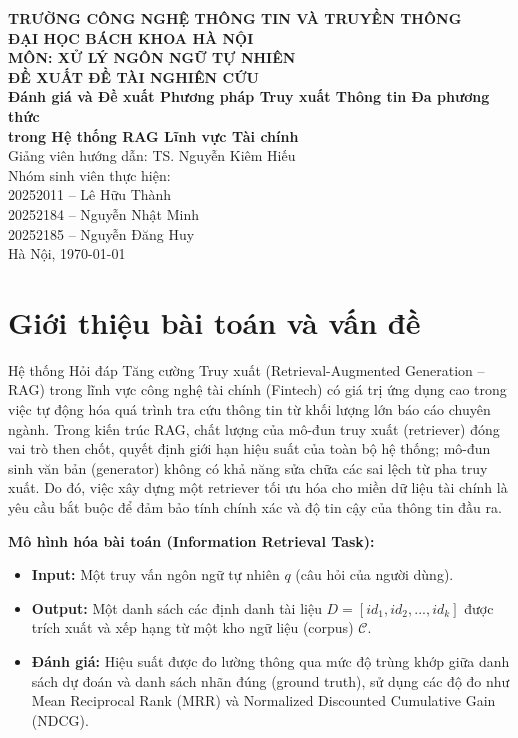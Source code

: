 \documentclass[12pt,a4paper]{article}
\begin{document}
\begin{center}
{\large \textbf{TRƯỜNG CÔNG NGHỆ THÔNG TIN VÀ TRUYỀN THÔNG}}\\
{\large \textbf{ĐẠI HỌC BÁCH KHOA HÀ NỘI}}\\[0.5cm]
{\large \textbf{MÔN: XỬ LÝ NGÔN NGỮ TỰ NHIÊN}}\\[0.5cm]
{\large \textbf{ĐỀ XUẤT ĐỀ TÀI NGHIÊN CỨU}}\\[0.5cm]
{\Large \textbf{Đánh giá và Đề xuất Phương pháp Truy xuất Thông tin Đa phương thức}}\\
{\Large \textbf{trong Hệ thống RAG Lĩnh vực Tài chính}}\\[0.5cm]
{\large Giảng viên hướng dẫn: TS. Nguyễn Kiêm Hiếu}\\[0.2cm]
{\large Nhóm sinh viên thực hiện:}\\
{\large 20252011 – Lê Hữu Thành}\\
{\large 20252184 – Nguyễn Nhật Minh}\\
{\large 20252185 – Nguyễn Đăng Huy}\\[0.5cm]
{\large Hà Nội, \today}
\end{center}

\section{Giới thiệu bài toán và vấn đề}

Hệ thống Hỏi đáp Tăng cường Truy xuất (Retrieval-Augmented Generation – RAG) trong lĩnh vực công nghệ tài chính (Fintech) có giá trị ứng dụng cao trong việc tự động hóa quá trình tra cứu thông tin từ khối lượng lớn báo cáo chuyên ngành. Trong kiến trúc RAG, chất lượng của mô-đun truy xuất (retriever) đóng vai trò then chốt, quyết định giới hạn hiệu suất của toàn bộ hệ thống; mô-đun sinh văn bản (generator) không có khả năng sửa chữa các sai lệch từ pha truy xuất. Do đó, việc xây dựng một retriever tối ưu hóa cho miền dữ liệu tài chính là yêu cầu bắt buộc để đảm bảo tính chính xác và độ tin cậy của thông tin đầu ra.

\textbf{Mô hình hóa bài toán (Information Retrieval Task):}
\begin{itemize}
    \item \textbf{Input:} Một truy vấn ngôn ngữ tự nhiên $q$ (câu hỏi của người dùng).
    \item \textbf{Output:} Một danh sách các định danh tài liệu $D = [id_1, id_2, ..., id_k]$ được trích xuất và xếp hạng từ một kho ngữ liệu (corpus) $\mathcal{C}$.
    \item \textbf{Đánh giá:} Hiệu suất được đo lường thông qua mức độ trùng khớp giữa danh sách dự đoán và danh sách nhãn đúng (ground truth), sử dụng các độ đo như Mean Reciprocal Rank (MRR) và Normalized Discounted Cumulative Gain (NDCG).
\end{itemize}
\end{document}
